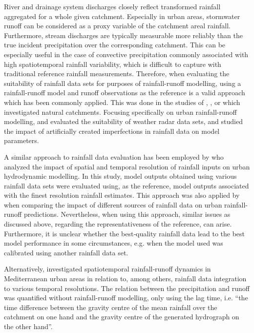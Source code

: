 \documentclass{ctuthesis}\usepackage[]{graphicx}\usepackage[]{color}
\begin{document}
River and drainage system discharges closely reflect transformed rainfall aggregated for a whole given catchment. Especially in urban areas, stormwater runoff can be considered as a proxy variable of the catchment areal rainfall. Furthermore, stream discharges are typically measurable more reliably than the true incident precipitation over the corresponding catchment. This can be especially useful in the case of convective precipitation commonly associated with high spatiotemporal rainfall variability, which is  difficult to capture with traditional reference rainfall measurements. Therefore, when evaluating the suitability of rainfall data sets for purposes of rainfall-runoff modelling, using a rainfall-runoff model and runoff observations as the reference is a valid approach which has been commonly applied. This was done in the studies of \cite{obledSensitivityHydrologicalModels1994}, \cite{segondSignificanceSpatialRainfall2007}, or \cite{sikorskaValueDifferentPrecipitation2018} which investigated natural catchments. Focusing specifically on urban rainfall-runoff modelling, \cite{goormansUsingLocalWeather2013} and \cite{wangSingularitysensitiveGaugebasedRadar2015} evaluated the suitability of weather radar data sets, and \cite{kleidorferImpactInputData2009} studied the impact of artificially created imperfections in rainfall data on model parameters.

A similar approach to rainfall data evaluation has been employed by  \cite{ochoa-rodriguezImpactSpatialTemporal2015} who analyzed the impact of spatial and temporal resolution of rainfall inputs on urban hydrodynamic modelling. In this study, model outputs obtained using various rainfall data sets were evaluated using, as the reference, model outputs associated with the finest resolution rainfall estimates. This approach was also applied by \cite{dischImpactDifferentSources2019} when comparing the impact of different sources of rainfall data on urban rainfall-runoff predictions. Nevertheless, when using this approach, similar issues as discussed above, regarding the representativeness of the reference, can arise. Furthermore, it is unclear whether the best‐quality rainfall data lead to the best model performance in some circumstances, e.g. when the model used was calibrated using another rainfall data set.

Alternatively, \cite{berneTemporalSpatialResolution2004} investigated spatiotemporal rainfall‐runoff dynamics in Mediterranean urban areas in relation to, among others, rainfall data integration to various temporal resolutions. The relation between the precipitation and runoff was quantified without rainfall-runoff modelling, only using the lag time, i.e. \enquote{the time difference between the gravity centre of the mean rainfall over the catchment on one hand and the gravity centre of the generated hydrograph on the other hand}. 
\end{document}

